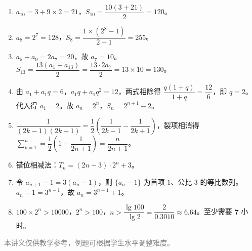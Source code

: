 \documentclass[12pt, a4paper]{ctexart}
\begin{document}
\begin{knowledgebox}[参考答案]
\begin{enumerate}
  \item $a_{10} = 3 + 9 \times 2 = 21$，$S_{10} = \dfrac{10(3 + 21)}{2} = 120$。

  \item $a_8 = 2^7 = 128$，$S_8 = \dfrac{1 \times (2^8 - 1)}{2 - 1} = 255$。

  \item $a_5 + a_9 = 2a_7 = 20$，故 $a_7 = 10$。$S_{13} = \dfrac{13(a_1 + a_{13})}{2} = \dfrac{13 \cdot 2a_7}{2} = 13 \times 10 = 130$。

  \item 由 $a_1 + a_1 q = 6$，$a_1 q + a_1 q^2 = 12$，两式相除得 $\dfrac{q(1+q)}{1+q} = \dfrac{12}{6}$，即 $q = 2$。代入得 $a_1 = 2$。故 $a_n = 2^n$，$S_n = 2^{n+1} - 2$。

  \item $\dfrac{1}{(2k-1)(2k+1)} = \dfrac{1}{2}\!\left(\dfrac{1}{2k-1} - \dfrac{1}{2k+1}\right)$，裂项相消得 $\displaystyle\sum_{k=1}^{n} = \dfrac{1}{2}\!\left(1 - \dfrac{1}{2n+1}\right) = \dfrac{n}{2n+1}$。

  \item 错位相减法：$T_n = (2n-3) \cdot 2^n + 3$。

  \item 令 $a_{n+1} - 1 = 3(a_n - 1)$，则 $\{a_n - 1\}$ 为首项 $1$、公比 $3$ 的等比数列。$a_n - 1 = 3^{n-1}$，故 $a_n = 3^{n-1} + 1$。

  \item $100 \times 2^n > 10000$，$2^n > 100$，$n > \dfrac{\lg 100}{\lg 2} = \dfrac{2}{0.3010} \approx 6.64$。至少需要 $\mathbf{7}$ 小时。
\end{enumerate}
\end{knowledgebox}

\vfill
\begin{center}
\small\textcolor{gray}{本讲义仅供教学参考，例题可根据学生水平调整难度。}
\end{center}
\end{document}
